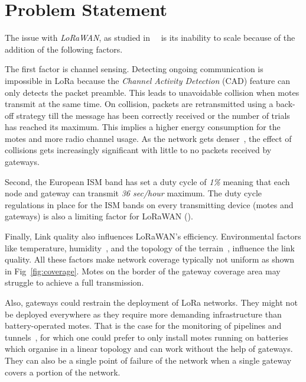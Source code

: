 


\section{Problem Statement}

The issue with \emph{LoRaWAN}, as studied
in~\cite{8030482}~\cite{10.1145/2988287.2989163} is its inability to scale
because of the addition of the following factors.

The first factor is channel sensing.
Detecting ongoing communication is impossible in LoRa because the \emph{Channel Activity Detection}
(CAD) feature can only detects the packet preamble. %
This leads to unavoidable collision when motes transmit at the same time.
On collision, packets are retransmitted using a back-off strategy till the
message has been correctly received or the number of trials has reached its
maximum.
This implies a higher energy consumption for the motes and more radio
channel usage.
As the network gets denser~\cite{8030482}, the effect of collisions gets
increasingly significant with little to no packets received by gateways.


Second, the European ISM band has set a duty cycle of \emph{1\%} meaning that
each node and gateway can transmit \emph{36 sec/hour} maximum.
The duty cycle regulations in place for the ISM bands on every
transmitting device (motes and gateways) is also a limiting factor
for LoRaWAN (\cite{8030482}).


Finally, Link quality also influences LoRaWAN's efficiency.
Environmental factors like temperature,
humidity~\cite{evaluation_of_the_reliability_of_lora}, and the topology of the
terrain~\cite{lorajambalaya}, influence the link quality.
All these factors make network coverage typically not uniform
as shown in Fig~\ref{fig:coverage}.
Motes on the border of the gateway coverage area may struggle to
achieve a full transmission.

Also, gateways could restrain the deployment of LoRa networks.
They might not be deployed everywhere as they require more demanding infrastructure
than battery-operated motes.
That is the case for the monitoring of pipelines and tunnels~\cite{Abrardo_2019},
for which one could prefer to only install motes running on batteries
which organise in a linear topology and can work without the help of gateways.
They can also be a single point of failure of the network when a single
gateway covers a portion of the network.

